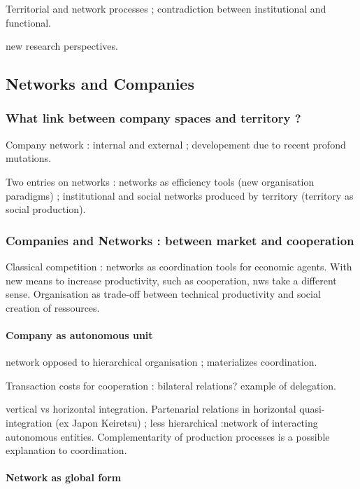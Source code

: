 Territorial and network processes ; contradiction between institutional and functional.

new research perspectives.


\subsection{Networks and Companies} 

\subsubsection*{What link between company spaces and territory ?}

Company network : internal and external ; developement due to recent profond mutations.

Two entries on networks : networks as efficiency tools (new organisation paradigms) ; institutional and social networks produced by territory (territory as social production).

\subsubsection*{Companies and Networks : between market and cooperation}

Classical competition : networks as coordination tools for economic agents. With new means to increase productivity, such as cooperation, nws take a different sense. Organisation as trade-off between technical productivity and social creation of ressources.

\paragraph{Company as autonomous unit}

network opposed to hierarchical organisation ; materializes coordination.

Transaction costs for cooperation : bilateral relations? example of delegation.

vertical vs horizontal integration. Partenarial relations in horizontal quasi-integration (ex Japon Keiretsu) ; less hierarchical  :network of interacting autonomous entities. Complementarity of production processes is a possible explanation to coordination.

\paragraph{Network as global form}

